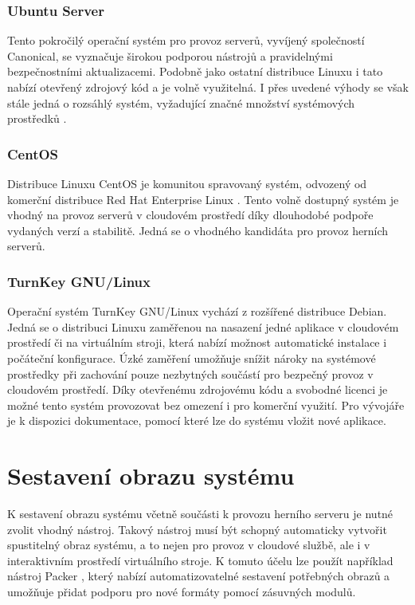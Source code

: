 \subsubsection{Ubuntu Server}

Tento pokročilý operační systém \cite{ubuntu_server} pro provoz serverů, vyvíjený společností Canonical, se vyznačuje širokou podporou nástrojů a pravidelnými bezpečnostními
aktualizacemi. Podobně jako ostatní distribuce Linuxu i tato nabízí otevřený zdrojový kód a je volně využitelná. I přes uvedené výhody se však stále jedná o
rozsáhlý systém, vyžadující značné množství systémových prostředků \cite{ubuntu_server_reqs}.

\subsubsection{CentOS}

Distribuce Linuxu CentOS je komunitou spravovaný systém, odvozený od komerční distribuce Red Hat Enterprise Linux \cite{centos}. Tento volně dostupný systém
je vhodný na provoz serverů v cloudovém prostředí díky dlouhodobé podpoře vydaných verzí a stabilitě. Jedná se o vhodného kandidáta pro provoz herních serverů.

\subsubsection{TurnKey GNU/Linux}

Operační systém TurnKey GNU/Linux \cite{linuxgsm} vychází z rozšířené distribuce Debian. Jedná se o distribuci Linuxu zaměřenou na nasazení jedné aplikace v cloudovém prostředí
či na virtuálním stroji, která nabízí možnost automatické instalace i počáteční konfigurace. Úzké zaměření umožňuje snížit nároky na systémové prostředky
při zachování pouze nezbytných součástí pro bezpečný provoz v cloudovém prostředí. Díky otevřenému zdrojovému kódu a svobodné licenci je možné
tento systém provozovat bez omezení i pro komerční využití. Pro vývojáře je k dispozici dokumentace, pomocí které lze do systému vložit
nové aplikace.

\section{Sestavení obrazu systému}

K sestavení obrazu systému včetně součásti k provozu herního serveru je nutné zvolit vhodný nástroj. Takový nástroj
musí být schopný automaticky vytvořit spustitelný obraz systému, a to nejen pro provoz v cloudové službě, ale i
v interaktivním prostředí virtuálního stroje. K tomuto účelu lze použít například nástroj Packer \cite{packer},
který nabízí automatizovatelné sestavení potřebných obrazů a umožňuje
přidat podporu pro nové formáty pomocí zásuvných modulů.

